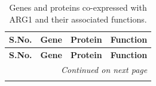 \begin{longtable}{|p{1cm}|p{2.5cm}|p{4cm}|p{4cm}|}
	
	\caption{Genes and proteins co-expressed with ARG1 and their associated functions.}
	\label{tab:arg1} \\
	
	\hline
	\textbf{S.No.} & \textbf{Gene} & \textbf{Protein} & \textbf{Function} \\
	\hline
	\endfirsthead
	
	\hline
	\textbf{S.No.} & \textbf{Gene} & \textbf{Protein} & \textbf{Function} \\
	\hline
	\endhead
	
	\hline
	\multicolumn{4}{r}{\textit{Continued on next page}} \\
	\endfoot
	
	\hline
	\endlastfoot
	

\end{longtable}

